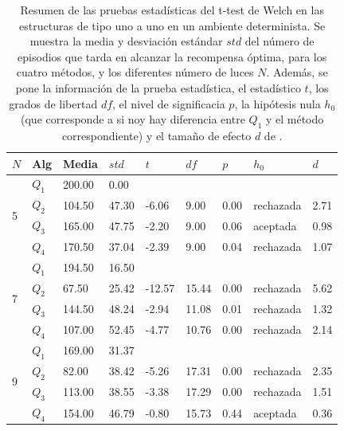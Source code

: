 \begin{table}[]
\centering
\caption{\footnotesize{Resumen de las pruebas estadísticas del t-test de Welch en las
estructuras de tipo uno a uno en un ambiente determinista. Se muestra la media y desviación estándar $std$ del número 
de episodios que tarda en alcanzar la recompensa óptima, para los cuatro métodos, y los diferentes número de luces $N$. Además, se pone la información
de la prueba estadística, el estadístico $t$, los grados de libertad $df$, el nivel
de significacia $p$, la hipótesis nula $h_0$ (que corresponde a si noy hay diferencia entre $Q_1$ y el método correspondiente) y el tamaño de efecto $d$ de \citet{cohen2013statistical}.}}
\label{tab:dqn-one-to-one-det}
\begin{tabular}{|l|l|l|l|l|l|l|l|l|}
\hline
$N$ & Alg & Media & $std$ & $t$ & $df$ & $p$ & $h_0$ & $d$ \\ \hline
\multirow{4}{*}{5} & $Q_1$ & 200.00 & 0.00 & \multicolumn{5}{l|}{} \\ \cline{2-9} 
 & $Q_2$ & 104.50 & 47.30 & -6.06 & 9.00 & 0.00 & rechazada & 2.71 \\ \cline{2-9} 
 & $Q_3$ & 165.00 & 47.75 & -2.20 & 9.00 & 0.06 & aceptada & 0.98 \\ \cline{2-9} 
 & $Q_4$ & 170.50 & 37.04 & -2.39 & 9.00 & 0.04 & rechazada & 1.07 \\ \hline
\multirow{4}{*}{7} & $Q_1$ & 194.50 & 16.50 & \multicolumn{5}{l|}{} \\ \cline{2-9} 
 & $Q_2$ & 67.50 & 25.42 & -12.57 & 15.44 & 0.00 & rechazada & 5.62 \\ \cline{2-9} 
 & $Q_3$ & 144.50 & 48.24 & -2.94 & 11.08 & 0.01 & rechazada & 1.32 \\ \cline{2-9} 
 & $Q_4$ & 107.00 & 52.45 & -4.77 & 10.76 & 0.00 & rechazada & 2.14 \\ \hline
\multirow{4}{*}{9} & $Q_1$ & 169.00 & 31.37 & \multicolumn{5}{l|}{} \\ \cline{2-9} 
 & $Q_2$ & 82.00 & 38.42 & -5.26 & 17.31 & 0.00 & rechazada & 2.35 \\ \cline{2-9} 
 & $Q_3$ & 113.00 & 38.55 & -3.38 & 17.29 & 0.00 & rechazada & 1.51 \\ \cline{2-9} 
 & $Q_4$ & 154.00 & 46.79 & -0.80 & 15.73 & 0.44 & aceptada & 0.36 \\ \hline
\end{tabular}
\end{table}


